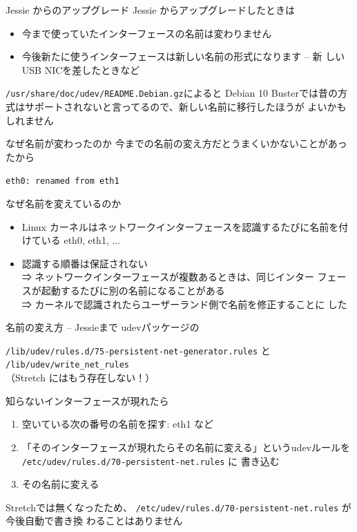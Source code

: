 \begin{frame}{Jessie からのアップグレード}
 Jessie からアップグレードしたときは
 \pause

 \begin{itemize}[<+->]
  \item 今まで使っていたインターフェースの名前は変わりません
  \item 今後新たに使うインターフェースは新しい名前の形式になります -- 新
	しいUSB NICを差したときなど
 \end{itemize}
 \pause
 {\small\texttt{/usr/share/doc/udev/README.Debian.gz}}によると
 Debian 10 Busterでは昔の方式はサポートされないと言ってるので、新しい名前に移行したほうが
 よいかもしれません
\end{frame}

\begin{frame}{なぜ名前が変わったのか}
 今までの名前の変え方だとうまくいかないことがあったから

 \pause
 \vspace{2em}
 \texttt{eth0: renamed from eth1}
\end{frame}

\begin{frame}{なぜ名前を変えているのか}
 \begin{itemize}[<+->]
  \item Linux カーネルはネットワークインターフェースを認識するたびに名前を付
	けている eth0, eth1, ...
  \item 認識する順番は保証されない\\ \pause
	⇒ ネットワークインターフェースが複数あるときは、同じインター
	フェースが起動するたびに別の名前になることがある\\ \pause
	⇒ カーネルで認識されたらユーザーランド側で名前を修正することに
	した
 \end{itemize}
\end{frame}

\begin{frame}{名前の変え方 -- Jessieまで}
 udevパッケージの

 {\small{\texttt{/lib/udev/rules.d/75-persistent-net-generator.rules}}} と
 {\small{\texttt{/lib/udev/write\_net\_rules}}}\\
 \pause
 （Stretch にはもう存在しない！）

 \pause
 知らないインターフェースが現れたら
 \pause
 \begin{enumerate}[<+->]
  \item 空いている次の番号の名前を探す: eth1 など
  \item 「そのインターフェースが現れたらその名前に変える」というudevルールを\\
	{\small{\texttt{/etc/udev/rules.d/70-persistent-net.rules}}} に
	書き込む
  \item その名前に変える
 \end{enumerate}
 \pause
 Stretchでは無くなったため、
 \small{\texttt{/etc/udev/rules.d/70-persistent-net.rules}} が今後自動で書き換
 わることはありません
\end{frame}

